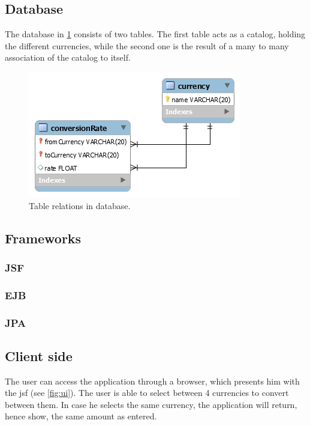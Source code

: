 \documentclass[a4paper]{scrartcl}
\begin{document}
\subsection{Database}
The database in \ref{fig:database} consists of two tables.
The first table acts as a catalog, holding the different currencies, while the second one is the result of a many to many association of the catalog to itself.

\begin{figure}[h!]
  \begin{center}
    \includegraphics[scale=0.8]{db.png}
    \caption{Table relations in database.}
    \label{fig:database}
  \end{center}
\end{figure}



\subsection{Frameworks}

\subsubsection{JSF}


\subsubsection{EJB}



\subsubsection{JPA}



\subsection{Client side}
The user can access the application through a browser, which presents him with the jsf (see \ref{fig:ui}).
The user is able to select between 4 currencies to convert between them.
In case he selects the same currency, the application will return, hence show, the same amount as entered.
\end{document}
